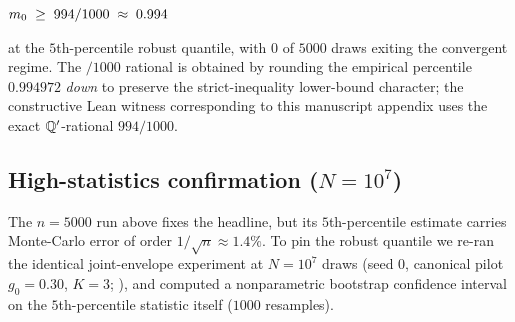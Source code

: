 \begin{infobox}[main][title=The bootstrap headline]
\begin{center}
\large
$m_0 \;\ge\; 994/1000 \;\approx\; 0.994$
\end{center}
at the $5$th-percentile robust quantile, with $0$ of $5000$ draws
exiting the convergent regime.  The $/1000$ rational is obtained by
rounding the empirical percentile $0.994972$ \emph{down} to
preserve the strict-inequality lower-bound character; the
constructive Lean witness corresponding to this manuscript
appendix uses the exact $\mathbb{Q}'$-rational $994/1000$.
\end{infobox}

\subsection{High-statistics confirmation
  (\texorpdfstring{$N = 10^7$}{N = 10^7})}
\label{sec:appx-bootstrap-highn}

%

The $n = 5000$ run above fixes the headline, but its $5$th-percentile
estimate carries Monte-Carlo error of order $1/\sqrt{n} \approx
1.4\%$.  To pin the robust quantile we re-ran the identical
joint-envelope experiment at $N = 10^7$ draws (seed $0$, canonical
pilot $g_0 = 0.30$, $K = 3$;
), and
computed a nonparametric bootstrap confidence interval on the
$5$th-percentile statistic itself ($1000$ resamples).

